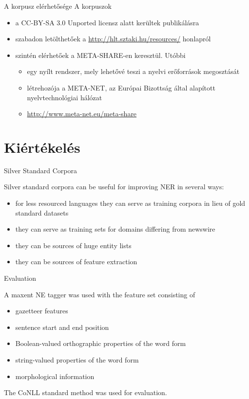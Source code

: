\documentclass[utf8x,t]{beamer}
\newcommand{\vitem}{\item \vspace{4pt}}
\begin{document}
\begin{frame}{A korpusz elérhetősége}
\bigskip
A korpuszok
\begin{itemize}
\vitem a CC-BY-SA 3.0 Unported licensz alatt kerültek publikálásra
\vitem szabadon letölthetőek a \url{http://hlt.sztaki.hu/resources/} honlapról
\vitem szintén elérhetőek a META-SHARE-en keresztül. Utóbbi
  \begin{itemize}
  \vitem egy nyílt rendszer, mely lehetővé teszi a nyelvi erőforrások megosztását
  \vitem létrehozója a META-NET, az Európai Bizottság által alapított nyelvtechnológiai hálózat
  \vitem \url{http://www.meta-net.eu/meta-share}
  \end{itemize}
\end{itemize}

\end{frame}

\section{Kiértékelés}

\begin{frame}{Silver Standard Corpora}

\bigskip

Silver standard corpora can be useful for improving NER in several ways:

\smallskip

\begin{itemize}
\vitem for less resourced languages they can serve as training corpora in lieu of gold standard datasets
\vitem they can serve as training sets for domains differing from newswire
\vitem they can be sources of huge entity lists
\vitem they can be sources of feature extraction
\end{itemize}

\end{frame}

\begin{frame}{Evaluation}

\bigskip

A maxent NE tagger was used with the feature set consisting of

\smallskip

\begin{itemize}
\vitem gazetteer features
\vitem sentence start and end position
\vitem Boolean-valued orthographic properties of the word form
\vitem string-valued properties of the word form
\vitem morphological information
\end{itemize}

\bigskip

The CoNLL standard method was used for evaluation.

\end{frame}
\end{document}
